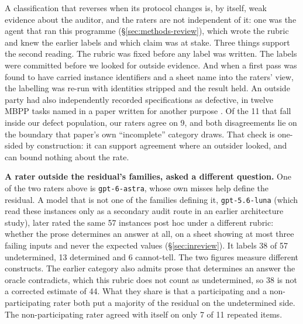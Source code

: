 A classification that reverses when its protocol changes is, by itself, weak evidence about the
auditor, and the raters are not independent of it: one was the agent that ran this programme
(\S\ref{sec:methods-review}), which wrote the rubric and knew the earlier labels and which claim
was at stake. Three things support the second reading. The rubric was fixed before any label was
written. The labels were committed before we looked for outside evidence. And when a first pass
was found to have carried instance identifiers and a sheet name into the raters' view, the
labelling was re-run with identities stripped and the result held. An outside party had also
independently recorded specifications as defective, in twelve MBPP tasks named in a paper written
for another purpose \citep{richter2026collapse}. Of the 11 that fall inside our
defect population, our raters agree on 9, and both disagreements lie on the boundary that paper's
own ``incomplete'' category draws. That check is one-sided by construction: it can support agreement where an
outsider looked, and can bound nothing about the rate.

\textbf{A rater outside the residual's families, asked a different question.} One of the two
raters above is \texttt{gpt-6-astra}, whose own misses help define the residual. A model that is
not one of the families defining it, \texttt{gpt-5.6-luna} (which read these instances only as a
secondary audit route in an earlier architecture study), later rated the same 57 instances post
hoc under a different rubric: whether the prose determines an answer at all, on a sheet showing at
most three failing inputs and never the expected values (\S\ref{sec:inreview}). It labels
38 of 57 undetermined, 13 determined and 6 cannot-tell. The two figures measure different
constructs. The earlier category also admits prose that determines an answer the oracle
contradicts, which this rubric does not count as undetermined, so 38 is not a corrected estimate
of 44. What they share is that a participating and a non-participating rater both put a majority
of the residual on the undetermined side. The non-participating rater agreed with itself on only
7 of 11 repeated items.


